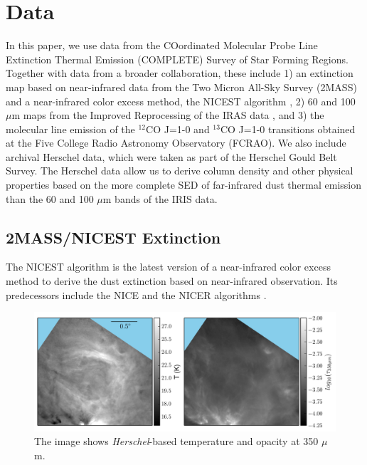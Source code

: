 \documentclass[11pt,a4paper]{emulateapj}
\begin{document}
\section{Data}
\label{sec:data}
In this paper, we use data from the COordinated Molecular Probe Line Extinction Thermal Emission (COMPLETE) Survey of Star Forming Regions. Together with data from a broader collaboration, these include 1) an extinction map based on near-infrared data from the Two Micron All-Sky Survey (2MASS) and a near-infrared color excess method, the NICEST algorithm \citep[][note that this is an improved version of the NICER algorithm and is developed after the COMPLETE Survey]{Lombardi_2009}, 2) 60 and 100 $\mu$m maps from the Improved Reprocessing of the IRAS data \citep[IRIS;]{Miville_Deschenes_2005}, and 3) the molecular line emission of the $^{12}$CO J=1-0 and $^{13}$CO J=1-0 transitions obtained at the Five College Radio Astronomy Observatory (FCRAO). We also include archival Herschel data, which were taken as part of the Herschel Gould Belt Survey. The Herschel data allow us to derive column density and other physical properties based on the more complete SED of far-infrared dust thermal emission than the 60 and 100 $\mu$m bands of the IRIS data.

\subsection{2MASS/NICEST Extinction}
The NICEST algorithm is the latest version of a near-infrared color excess method to derive the dust extinction based on near-infrared observation. Its predecessors include the NICE and the NICER algorithms \citep{Lombardi_2001,Lombardi_2005}.

\begin{figure}[ht]
\centering
\includegraphics[scale=0.8]{fig/shell_herschel.png}
\caption{The image shows \textit{Herschel}-based temperature and opacity at 350 $\mu$m.
}
\end{figure}
\end{document}
